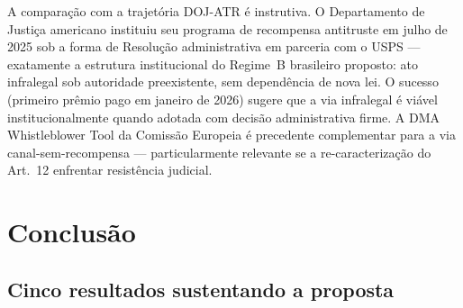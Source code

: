 \documentclass[12pt,a4paper]{article}
\begin{document}
A comparação com a trajetória DOJ-ATR \citep{dojatr2025} é instrutiva. O
Departamento de Justiça americano instituiu seu programa de recompensa
antitruste em julho de 2025 sob a forma de Resolução administrativa em
parceria com o USPS --- exatamente a estrutura institucional do
Regime~B brasileiro proposto: ato infralegal sob autoridade preexistente,
sem dependência de nova lei. O sucesso (primeiro prêmio pago em janeiro
de 2026) sugere que a via infralegal é viável institucionalmente quando
adotada com decisão administrativa firme. A DMA Whistleblower Tool da
Comissão Europeia \citep{dmatool2024} é precedente complementar para a
via canal-sem-recompensa --- particularmente relevante se a
re-caracterização do Art.~12 enfrentar resistência judicial.

\section{Conclusão}

\subsection{Cinco resultados sustentando a proposta}
\end{document}
